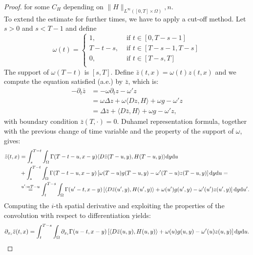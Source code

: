 \documentclass[10pt,a4paper,nouppercase,nowrite]{article}
\numberwithin{equation}{section}
\newcommand{\di}{{\rm d}}
\theoremstyle{definition}
\begin{document}
\begin{proof}
		for some $C_H$ depending on $\| H \|_{L^{\infty}([0,T] \times \Omega)},n$. \\
		To extend the estimate for further times, we have to apply a cut-off method. Let $s > 0$ and $s < T-1$ and define
		\begin{equation*}
			\omega(t)=
			\begin{cases}
				1,& \text{ if } t \in [0,T-s-1] \\
				T-t-s,& \text{ if } t \in [T-s-1,T-s] \\
				0,& \text{ if } t \in [T-s,T] \\
			\end{cases}
		\end{equation*}
		The support of $\omega(T-t)$ is $[s,T]$. Define $\bar{z}(t,x)=\omega(t)z(t,x)$ and we compute the equation satisfied (a.e.) by $\bar{z}$, which is:
		\begin{equation*}
			\begin{aligned}
				-\partial_t \bar{z} &= -\omega \partial_t z - \omega' z \\
				&= \omega \Delta z + \omega \langle Dz,H \rangle + \omega g- \omega' z \\
				&= \Delta \bar{z} + \langle D\bar{z},H \rangle + \omega g - \omega' z,
			\end{aligned}
		\end{equation*}
		with boundary condition $\bar{z}(T,\cdot)=0$. Duhamel representation formula, together with the previous change of time variable and the property of the support of $\omega$, gives:
		\begin{equation*}
			\begin{split}
			\bar{z}(t,x) &= \int_s^{T-t} \int_{\Omega} \Gamma(T-t-u,x-y) \langle D\bar{z}(T-u,y),H(T-u,y) \rangle \di y \di u \\
			&+ \int_s^{T-t} \int_{\Omega} \Gamma(T-t-u,x-y) \left[ \omega(T-u)g(T-u,y) - \omega'(T-u)z(T-u,y) \right] \di y \di u = \\
			&\overset{u':=T-u}{=}\int_t^{T-s} \int_{\Omega} \Gamma(u'-t,x-y) \left[ \langle D\bar{z}(u',y),H(u',y) \rangle + \omega(u')g(u',y) - \omega'(u')z(u',y) \right] \di y \di u'.
			\end{split}
		\end{equation*}
		Computing the $i$-th spatial derivative and exploiting the properties of the convolution with respect to differentiation yields:
		$$\partial_{x_i} \bar{z}(t,x) = \int_t^{T-s} \int_{\Omega} \partial_{x_i} \Gamma(u-t,x-y) \left[ \langle D\bar{z}(u,y),H(u,y) \rangle + \omega(u)g(u,y) - \omega'(u)z(u,y) \right] \di y \di u.$$

\end{proof}
\end{document}

